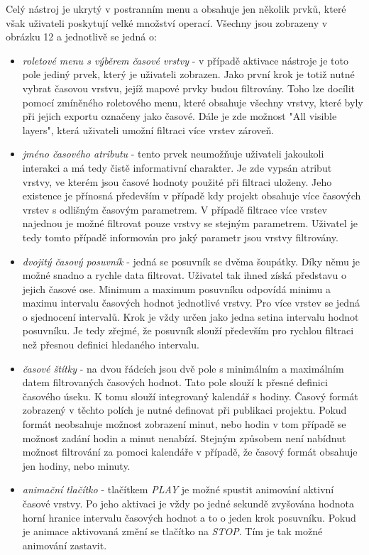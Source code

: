 Celý nástroj je ukrytý v postranním menu a obsahuje jen několik prvků,
které však uživateli poskytují velké množství operací. Všechny jsou
zobrazeny v obrázku 12 a jednotlivě se jedná o:

\begin{itemize}
	\item\textit{roletové menu s výběrem časové vrstvy} - v
	případě aktivace nástroje je toto pole jediný prvek, který je
	uživateli zobrazen. Jako první krok je totiž nutné vybrat
	časovou vrstvu, jejíž mapové prvky budou filtrovány. Toho lze
	docílit pomocí zmíněného roletového menu, které obsahuje
	všechny vrstvy, které byly při jejich exportu označeny jako
	časové. Dále je zde možnost "All visible layers", která
	uživateli umožní filtraci více vrstev
	zároveň.
        \item\textit{jméno časového atributu} - tento prvek
	neumožňuje uživateli jakoukoli interakci a má tedy čistě
	informativní charakter. Je zde vypsán atribut vrstvy, ve
	kterém jsou časové hodnoty použité při filtraci uloženy. Jeho
	existence je přínosná především v případě kdy projekt obsahuje
	více časových vrstev s odlišným časovým parametrem. V případě
	filtrace více vrstev najednou je možné filtrovat pouze vrstvy
	se stejným parametrem. Uživatel je tedy tomto případě
	informován pro jaký parametr jsou vrstvy
	filtrovány.
        \item\textit{dvojitý časový posuvník} - jedná se
	posuvník se dvěma šoupátky. Díky němu je možné snadno a rychle
	data filtrovat. Uživatel tak ihned získá představu o jejich
	časové ose. Minimum a maximum posuvníku odpovídá minimu a
	maximu intervalu časových hodnot jednotlivé vrstvy. Pro více
	vrstev se jedná o sjednocení intervalů. Krok je vždy určen
	jako jedna setina intervalu hodnot posuvníku. Je tedy zřejmé,
	že posuvník slouží především pro rychlou filtraci než přesnou
	definici hledaného intervalu.
        \item\textit{časové štítky} -
	na dvou řádcích jsou dvě pole s minimálním a maximálním datem
	filtrovaných časových hodnot. Tato pole slouží k přesné
	definici časového úseku. K tomu slouží integrovaný kalendář s
	hodiny. Časový formát zobrazený v těchto polích je nutné
	definovat při publikaci projektu. Pokud formát neobsahuje
	možnost zobrazení minut, nebo hodin v tom případě se možnost
	zadání hodin a minut nenabízí. Stejným způsobem není nabídnut
	možnost filtrování za pomoci kalendáře v případě, že časový
	formát obsahuje jen hodiny, nebo
	minuty.
        \item\textit{animační tlačítko} -
	tlačítkem \textit{PLAY} je možné spustit animování aktivní
	časové vrstvy. Po jeho aktivaci je vždy po jedné sekundě
	zvyšována hodnota horní hranice intervalu časových hodnot a to
	o jeden krok posuvníku. Pokud je animace aktivovaná změní se
	tlačítko na \textit{STOP}. Tím je tak možné animování
	zastavit.
\end{itemize}

